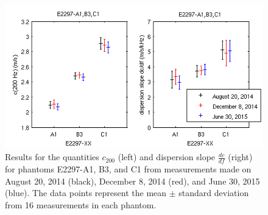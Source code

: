 \begin{figure}[htb!]
    \centering
    \includegraphics[width=0.75\linewidth]{phase2_longitudinal_stability.png}
    \caption{Results for the quantities $c_{200}$ (left) and dispersion slope
        $\frac{dc}{df}$ (right) for phantoms E2297-A1, B3, and C1 from
        measurements made on August 20, 2014 (black), December 8, 2014 (red),
        and June 30, 2015 (blue). The data points represent the mean $\pm$
        standard deviation from 16 measurements in each phantom.}
\label{fig:phase2_longitudinal_stability}
\end{figure}
